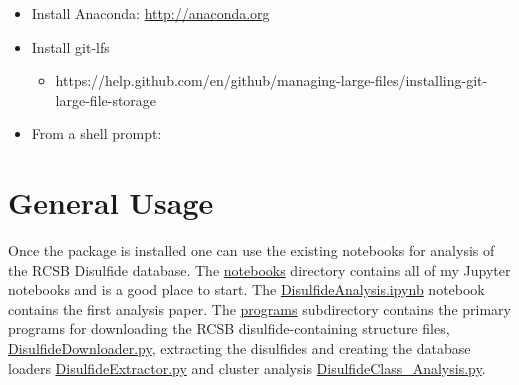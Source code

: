 \begin{itemize}
\item
  Install Anaconda: \url{http://anaconda.org}
\item
  Install git-lfs

  \begin{itemize}
  \tightlist
  \item
    https://help.github.com/en/github/managing-large-files/installing-git-large-file-storage
  \end{itemize}
\item
  From a shell prompt:

\begin{Shaded}
\begin{Highlighting}[]
  \ExtensionTok{$}  
  \ExtensionTok{$}
  \ExtensionTok{$}
  \ExtensionTok{$}\OperatorTok{=}
  \ExtensionTok{$}
  \ExtensionTok{$}
  \ExtensionTok{$} 
  \ExtensionTok{$}  
\end{Highlighting}
\end{Shaded}
\end{itemize}

\hypertarget{general-usage}{%
\section{General Usage}\label{general-usage}}

Once the package is installed one can use the existing notebooks for
analysis of the RCSB Disulfide database. The \href{}{notebooks}
directory contains all of my Jupyter notebooks and is a good place to
start. The
\href{https://github.com/suchanek/proteusPy/blob/master/notebooks/DisulfideAnalysis.ipynb}{DisulfideAnalysis.ipynb}
notebook contains the first analysis paper. The
\href{https://github.com/suchanek/proteusPy/tree/master/programs}{programs}
subdirectory contains the primary programs for downloading the RCSB
disulfide-containing structure files,
\href{https://github.com/suchanek/proteusPy/blob/master/programs/DisulfideDownloader.py}{DisulfideDownloader.py},
extracting the disulfides and creating the database loaders
\href{https://github.com/suchanek/proteusPy/blob/master/programs/DisulfideExtractor.py}{DisulfideExtractor.py}
and cluster analysis
\href{https://github.com/suchanek/proteusPy/blob/master/programs/DisulfideExtractor.py}{DisulfideClass\_Analysis.py}.

